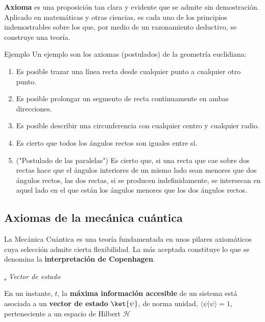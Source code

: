 \documentclass[a4paper,11pt]{book} %
\numberwithin{equation}{chapter}
\newcommand{\braket}[2]{\langle #1|#2\rangle}
\def\subsubiContadorIt{\par\addtocounter{subsubsection}{1}\underline{\it\thesubsubsection.}\hskip0.5cm \setcounter{subsubsubsectionIt}{0}}
\newcommand{\SubsubiIt}[1]{
		\subsubiContadorIt \textit{#1}
	}
\newcounter{subsubsubsectionIt}[subsubsection]
\begin{document}
\begin{mybox_gray2}{}
\textbf{Axioma} es una proposición tan clara y evidente que se admite sin demostración. Aplicado en matemáticas y otras ciencias, es cada uno de los principios indemostrables sobre los que, por medio de un razonamiento deductivo, se construye una teoría.
\end{mybox_gray2}

\begin{mybox_green}{Ejemplo}
Un ejemplo son los axiomas (postulados) de la geometría euclidiana:
\begin{enumerate}
	\item Es posible trazar una línea recta desde cualquier punto a cualquier otro punto.
	\item Es posible prolongar un segmento de recta continuamente en ambas direcciones.
	\item Es posible describir una circunferencia con cualquier centro y cualquier radio.
	\item Es cierto que todos los ángulos rectos son iguales entre sí.
	\item ("Postulado de las paralelas") Es cierto que, si una recta que cae sobre dos rectas hace que el ángulos interiores de un mismo lado sean menores que dos ángulos rectos, las dos rectas, si se producen indefinidamente, se intersecan en aquel lado en el que están los ángulos menores que los dos ángulos rectos.
\end{enumerate}
\end{mybox_green}	
	

		\subsection{Axiomas de la mecánica cuántica}	

La Mecánica Cuántica es una teoría fundamentada en unos pilares axiomáticos cuya selección admite cierta flexibilidad. La más aceptada constituye lo que se denomina la \textbf{interpretación de Copenhagen}. 

		\SubsubiIt{Vector de estado}

\begin{mybox_gray2}{}
En un instante, $t$, la \textbf{máxima información accesible} de un sistema está asociada a un \textbf{vector de estado} $\ket{\psi}$, de norma unidad, $\braket{\psi}{\psi}=1$,  
perteneciente a un espacio de Hilbert $\mathcal{H}$
\end{mybox_gray2}
\end{document}
